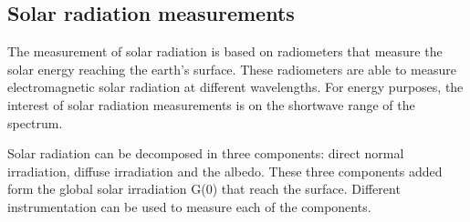 \subsection{Solar radiation measurements}%

The measurement of solar radiation is based on radiometers that measure the solar energy reaching the earth's surface. These radiometers are able to measure electromagnetic solar radiation at different wavelengths. For energy purposes, the interest of solar radiation measurements is on the shortwave range of the spectrum.

Solar radiation can be decomposed in three components: direct normal irradiation, diffuse irradiation and the albedo. These three components added form the global solar irradiation G(0) that reach the surface. Different instrumentation can be used to measure each of the components.




